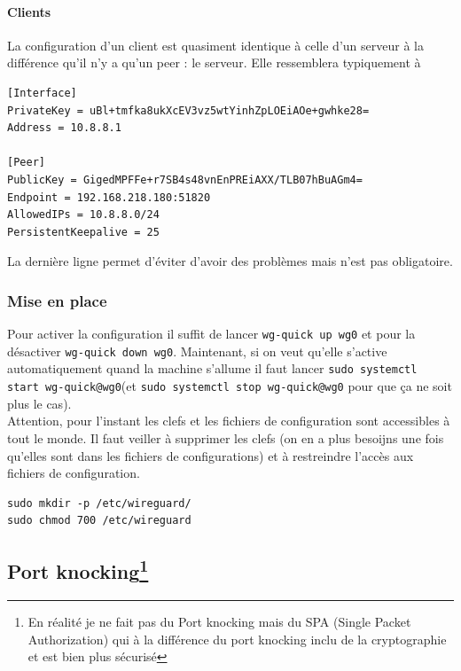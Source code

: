 \documentclass[a4paper, 12pt]{article}
\begin{document}
\paragraph{Clients}
La configuration d'un client est quasiment identique à celle d'un serveur à la différence qu'il n'y a qu'un peer : le serveur. Elle ressemblera typiquement à 

\begin{lstlisting}[language = shell]
[Interface]
PrivateKey = uBl+tmfka8ukXcEV3vz5wtYinhZpLOEiAOe+gwhke28=
Address = 10.8.8.1

[Peer]
PublicKey = GigedMPFFe+r7SB4s48vnEnPREiAXX/TLB07hBuAGm4= 
Endpoint = 192.168.218.180:51820
AllowedIPs = 10.8.8.0/24
PersistentKeepalive = 25
\end{lstlisting}
La dernière ligne permet d'éviter d'avoir des problèmes mais n'est pas obligatoire.
\subsubsection{Mise en place}
Pour activer la configuration il suffit de lancer \verb+wg-quick up wg0+ et pour la désactiver \verb+wg-quick down wg0+. Maintenant, si on veut qu'elle s'active automatiquement quand la machine s'allume il faut lancer \verb+sudo systemctl start wg-quick@wg0+(et \verb+sudo systemctl stop wg-quick@wg0+ pour que ça ne soit plus le cas). \\

Attention, pour l'instant les clefs et les fichiers de configuration sont accessibles à tout le monde. Il faut veiller à supprimer les clefs (on en a plus besoijns une fois qu'elles sont dans les fichiers de configurations) et à restreindre l'accès aux fichiers de configuration. 

\begin{center}
\begin{minipage}{.51\linewidth}
\begin{lstlisting}[language = shell]
sudo mkdir -p /etc/wireguard/
sudo chmod 700 /etc/wireguard
\end{lstlisting}
\end{minipage}
\end{center}

\subsection{Port knocking\protect\footnote{En réalité je ne fait pas du Port knocking mais du SPA (Single Packet Authorization)  qui à la différence du port knocking inclu de la cryptographie et est bien plus sécurisé}}
\end{document}

